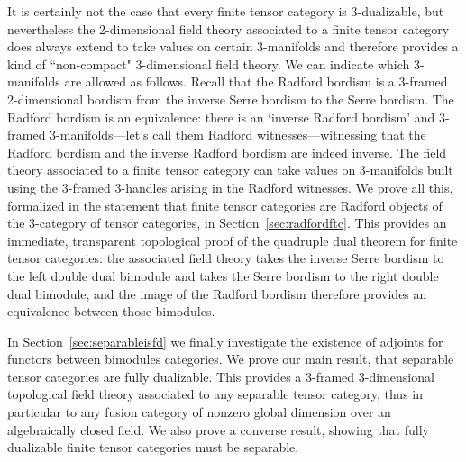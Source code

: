 \documentclass{amsart}
\begin{document}
It is certainly not the case that every finite tensor category is 3-dualizable, but nevertheless the 2-dimensional field theory associated to a finite tensor category does always extend to take values on certain 3-manifolds and therefore provides a kind of ``non-compact" 3-dimensional field theory.  
We can indicate which 3-manifolds are allowed as follows.  Recall that the Radford bordism is a 3-framed 2-dimensional bordism from the inverse Serre bordism to the Serre bordism.  The Radford bordism is an equivalence: there is an `inverse Radford bordism' and 3-framed 3-manifolds---let's call them Radford witnesses---witnessing that the Radford bordism and the inverse Radford bordism are indeed inverse.  The field theory associated to a finite tensor category can take values on 3-manifolds built using the 3-framed 3-handles arising in the Radford witnesses.  We prove all this, formalized in the statement that finite tensor categories are Radford objects of the 3-category of tensor categories, in Section~\ref{sec:radfordftc}.  This provides an immediate, transparent topological proof of the quadruple dual theorem for finite tensor categories: the associated field theory takes the inverse Serre bordism to the left double dual bimodule and takes the Serre bordism to the right double dual bimodule, and the image of the Radford bordism therefore provides an equivalence between those bimodules.

In Section~\ref{sec:separableisfd} we finally investigate the existence of adjoints for functors between bimodules categories.  We prove our main result, that separable tensor categories are fully dualizable.  This provides a 3-framed 3-dimensional topological field theory associated to any separable tensor category, thus in particular to any fusion category of nonzero global dimension over an algebraically closed field.  We also prove a converse result, showing that fully dualizable finite tensor categories must be separable.
\end{document}
